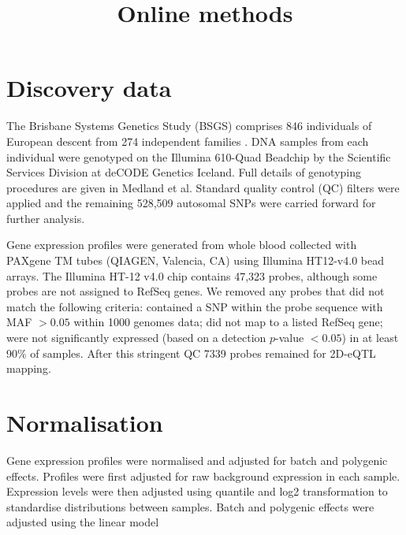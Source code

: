 \documentclass{article}
\title{Online methods}
\date{}
\author{}
\begin{document}
\maketitle


\section{Discovery data}

The Brisbane Systems Genetics Study (BSGS) comprises 846 individuals of European descent from 274 independent families \cite{Powell2012}. DNA samples from each individual were genotyped on the Illumina 610-Quad Beadchip by the Scientific Services Division at deCODE Genetics Iceland. Full details of genotyping procedures are given in Medland et al. \cite{Medland2009} Standard quality control (QC) filters were applied and the remaining 528,509 autosomal SNPs were carried forward for further analysis. 

Gene expression profiles were generated from whole blood collected with PAXgene TM tubes (QIAGEN, Valencia, CA) using Illumina HT12-v4.0 bead arrays. The Illumina HT-12 v4.0 chip contains 47,323 probes, although some probes are not assigned to RefSeq genes. We removed any probes that did not match the following criteria: contained a SNP within the probe sequence with MAF $ > 0.05$ within 1000 genomes data; did not map to a listed RefSeq gene; were not significantly expressed (based on a detection $p$-value $< 0.05$) in at least 90\% of samples. After this stringent QC 7339 probes remained for 2D-eQTL mapping.


\section{Normalisation}

Gene expression profiles were normalised and adjusted for batch and polygenic effects. Profiles were first adjusted for raw background expression in each sample. Expression levels were then adjusted using quantile and log2 transformation to standardise distributions between samples. Batch and polygenic effects were adjusted using the linear model
\end{document}
